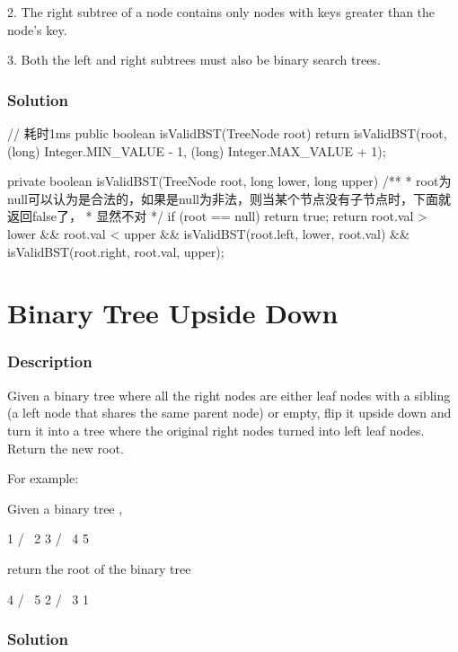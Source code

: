 2. The right subtree of a node contains only nodes with keys greater than the node's key.

3. Both the left and right subtrees must also be binary search trees.

\subsubsection{Solution}

\begin{Code}
// 耗时1ms
public boolean isValidBST(TreeNode root) {
    return isValidBST(root, (long) Integer.MIN_VALUE - 1, (long) Integer.MAX_VALUE + 1);
}

private boolean isValidBST(TreeNode root, long lower, long upper) {
    /**
     * root为null可以认为是合法的，如果是null为非法，则当某个节点没有子节点时，下面就返回false了，
     * 显然不对
     */
    if (root == null) {
        return true;
    }
    return root.val > lower && root.val < upper
            && isValidBST(root.left, lower, root.val)
            && isValidBST(root.right, root.val, upper);
}
\end{Code}

\newpage


\section{Binary Tree Upside Down} %

\subsubsection{Description}
Given a binary tree where all the right nodes are either leaf nodes with a sibling (a left node that shares the same parent node) or empty, flip it upside down and turn it into a tree where the original right nodes turned into left leaf nodes. Return the new root.

For example:

Given a binary tree ,
\begin{Code}
    1
   / \
  2   3
 / \
4   5
\end{Code}

return the root of the binary tree
\begin{Code}
   4
  / \
 5   2
    / \
   3   1
\end{Code}

\subsubsection{Solution}

